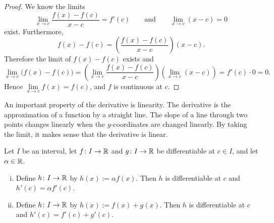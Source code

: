 \begin{proof}
We know the limits
\begin{equation*}
\lim_{x\to c}\frac{f(x)-f(c)}{x-c} = f'(c)
\qquad
\text{and}
\qquad
\lim_{x\to c}(x-c) = 0
\end{equation*}
exist.  Furthermore,
\begin{equation*}
f(x)-f(c) = 
\left( \frac{f(x)-f(c)}{x-c} \right) (x-c) .
\end{equation*}
Therefore the limit of $f(x)-f(c)$ exists and
\begin{equation*}
\lim_{x\to c} \bigl( f(x)-f(c) \bigr) =
\left(\lim_{x\to c} \frac{f(x)-f(c)}{x-c} \right)
\left(\lim_{x\to c} (x-c) \right) =
f'(c) \cdot 0  = 0.
\end{equation*}
Hence $\lim\limits_{x\to c} f(x) = f(c)$, and $f$ is continuous at $c$.
\end{proof}

An important property of the derivative is linearity.  The
derivative is the approximation of a function by a straight line.
The slope of a line through two points changes linearly when the
$y$-coordinates are changed linearly.  By taking the limit,
it makes sense that the derivative is linear.

\begin{prop}
Let $I$ be an interval, let
$f \colon I \to {\mathbb{R}}$ and $g \colon I \to {\mathbb{R}}$ be differentiable at $c \in I$,
and let $\alpha \in {\mathbb{R}}$.
\begin{enumerate}[(i)]
\item
Define $h \colon I \to {\mathbb{R}}$ by $h(x) := \alpha f(x)$.  Then
$h$ is differentiable at $c$ and
$h'(c) = \alpha f'(c)$.
\item
Define $h \colon I \to {\mathbb{R}}$ by $h(x) :=  f(x) + g(x)$.  Then
$h$ is differentiable at $c$ and
$h'(c) =  f'(c) + g'(c)$.
\end{enumerate}
\end{prop}

